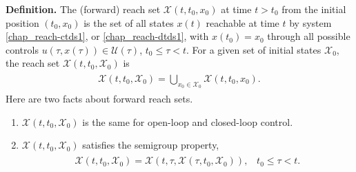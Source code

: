 \documentclass[letterpaper,10pt,english]{sphinxmanual}
\begin{document}
\textbf{Definition.} The (forward) reach set \({\mathcal X}(t, t_0, x_0)\) at time
\(t>t_0\) from the initial position \((t_0, x_0)\) is the set of
all states \(x(t)\) reachable at time \(t\) by system \eqref{chap_reach-ctds1},
or \eqref{chap_reach-dtds1}, with \(x(t_0)=x_0\) through all possible controls
\(u(\tau, x(\tau))\in{\mathcal U}(\tau)\),
\(t_0\leqslant\tau< t\). For a given set of initial states
\({\mathcal X}_0\), the reach set
\({\mathcal X}(t, t_0, {\mathcal X}_0)\) is
\label{chap_reach:equation-def_olrs}\begin{gather}
\begin{split}{\mathcal X}(t, t_0, {\mathcal X}_0) = \bigcup_{x_0\in{\mathcal X}_0}{\mathcal X}(t, t_0, x_0).\end{split}\label{chap_reach-def_olrs}
\end{gather}
Here are two facts about forward reach sets.
\begin{enumerate}
\item {} 
\({\mathcal X}(t, t_0, {\mathcal X}_0)\) is the same for
open-loop and closed-loop control.

\item {} 
\({\mathcal X}(t, t_0, {\mathcal X}_0)\) satisfies the semigroup
property,
\label{chap_reach:equation-semigroup}\begin{gather}
\begin{split}{\mathcal X}(t, t_0, {\mathcal X}_0) = {\mathcal X}(t, \tau, {\mathcal X}(\tau, t_0, {\mathcal X}_0)), \;\;\;
t_0\leqslant\tau< t.\end{split}\label{chap_reach-semigroup}
\end{gather}
\end{enumerate}
\end{document}
